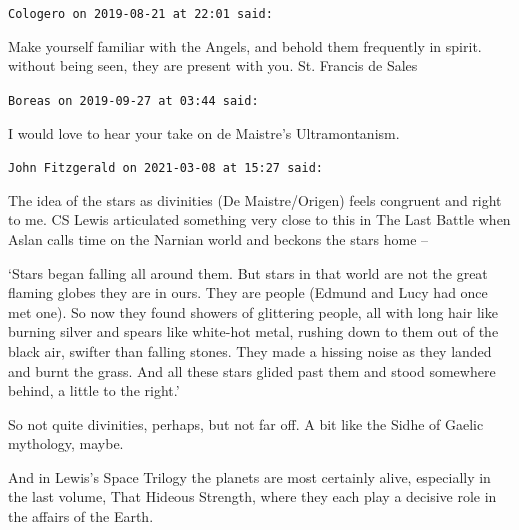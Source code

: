 \begin{footnotesize}
\begin{sffamily}
\texttt{Cologero on 2019-08-21 at 22:01 said:}

Make yourself familiar with the Angels, and behold them frequently in spirit. without being seen, they are present with you. St. Francis de Sales

\hfill

\texttt{Boreas on 2019-09-27 at 03:44 said:}

I would love to hear your take on de Maistre's Ultramontanism.

\hfill

\texttt{John Fitzgerald on 2021-03-08 at 15:27 said:}

The idea of the stars as divinities (De Maistre/Origen) feels congruent and right to me. CS Lewis articulated something very close to this in The Last Battle when Aslan calls time on the Narnian world and beckons the stars home --

`Stars began falling all around them. But stars in that world are not the great flaming globes they are in ours. They are people (Edmund and Lucy had once met one). So now they found showers of glittering people, all with long hair like burning silver and spears like white-hot metal, rushing down to them out of the black air, swifter than falling stones. They made a hissing noise as they landed and burnt the grass. And all these stars glided past them and stood somewhere behind, a little to the right.'

So not quite divinities, perhaps, but not far off. A bit like the Sidhe of Gaelic mythology, maybe.

And in Lewis's Space Trilogy the planets are most certainly alive, especially in the last volume, That Hideous Strength, where they each play a decisive role in the affairs of the Earth.


\hfill

\end{sffamily}
\end{footnotesize}

